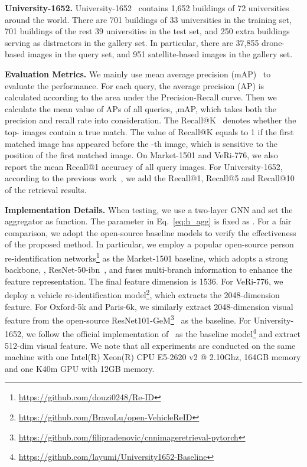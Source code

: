 \documentclass[10pt,twocolumn,letterpaper]{article}
\begin{document}
\noindent  \textbf{University-1652.} 
University-1652~\cite{zheng2020university} contains 1,652 buildings of 72 universities around the world. There are 701 buildings of 33 universities in the training set, 701 buildings of the rest 39 universities in the test set, and 250 extra buildings serving as distractors in the gallery set. In particular, there are 37,855 drone-based images in the query set, and 951 satellite-based images in the gallery set.

\noindent \textbf{Evaluation Metrics.}
We mainly use mean average precision (mAP)~\cite{zheng2015scalable} to evaluate the performance. For each query, the average precision (AP) is calculated according to the area under the Precision-Recall curve. Then we calculate the mean value of APs of all queries, \ie,mAP, which takes both the precision and recall rate into consideration.
The Recall@K~\cite{zhai2017predicting, liu2019lending, vo2016localizing} denotes whether the top- images contain a true match. The value of Recall@K equals to 1 if the first matched image has appeared before the -th image, which is sensitive to the position of the first matched image. 
On Market-1501 and VeRi-776, we also report the mean Recall@1 accuracy of all query images. For University-1652, according to the previous work~\cite{zhai2017predicting, liu2019lending, vo2016localizing}, we add the  Recall@1, Recall@5 and Recall@10 of the retrieval results. 



\noindent \textbf{Implementation Details.}
When testing, we use a two-layer GNN and set the aggregator as  function.
The parameter  in Eq.~\ref{eq:h_agg} is fixed as .
For a fair comparison, we adopt the open-source baseline models to verify the effectiveness of the proposed method.
In particular, we employ a popular open-source person re-identification networks\footnote{\tiny\url{https://github.com/douzi0248/Re-ID}} as the Market-1501 baseline, which adopts a strong backbone, \ie, ResNet-50-ibn~\cite{pan2018two}, and fuses multi-branch information to enhance the feature representation. The final feature dimension is 1536. For VeRi-776, we deploy a vehicle re-identification model\footnote{\tiny\url{https://github.com/BravoLu/open-VehicleReID}}, which extracts the 2048-dimension feature.  
For Oxford-5k and Paris-6k, we similarly extract 2048-dimension visual feature from the open-source ResNet101-GeM\footnote{\tiny\url{https://github.com/filipradenovic/cnnimageretrieval-pytorch}}~\cite{radenovic2018fine} as the baseline.
For University-1652, we follow the official implementation of~\cite{zheng2020university}  as the baseline model\footnote{\tiny\url{https://github.com/layumi/University1652-Baseline}} and extract 512-dim visual feature. We note that all experiments are conducted on the same machine with one Intel(R) Xeon(R) CPU E5-2620 v2 @ 2.10Ghz, 164GB memory and one K40m GPU with 12GB memory.
\end{document}
